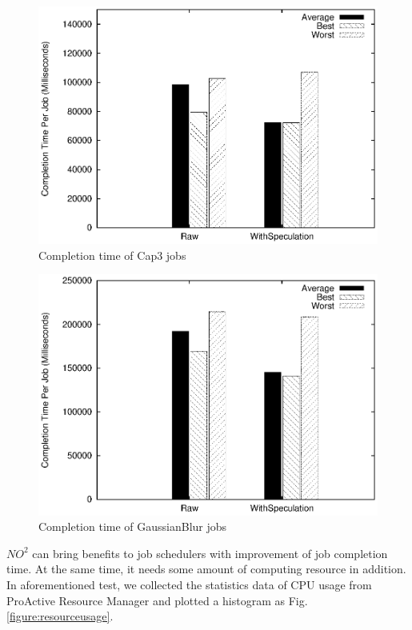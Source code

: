 \begin{figure}
\centering
\includegraphics[width=0.9\columnwidth]{figures/completiontime_cap3.eps}
\caption{Completion time of Cap3 jobs}
\label{figure:completiontime_cap3}
\end{figure}

\begin{figure}
\centering
\includegraphics[width=0.9\columnwidth]{figures/completiontime_gaussianblur.eps}
\caption{Completion time of GaussianBlur jobs}
\label{figure:completiontime_gaussianblur}
\end{figure}

$NO^2$ can bring benefits to job schedulers with improvement of job completion time. At the same time, it needs some amount of computing resource in addition. In aforementioned test, we collected the statistics data of CPU usage from ProActive Resource Manager and plotted a histogram as Fig. \ref{figure:resourceusage}.

